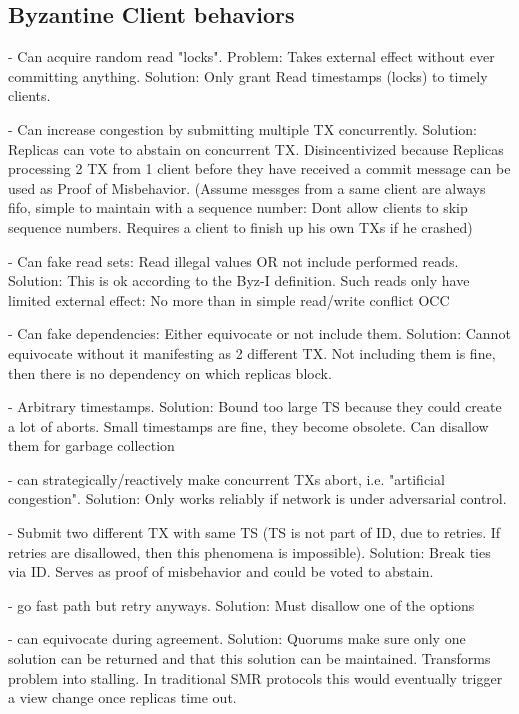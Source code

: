 \subsection{Byzantine Client behaviors}

- Can acquire random read "locks". Problem: Takes external effect without ever committing anything. Solution: Only grant Read timestamps (locks) to timely clients. 

- Can increase congestion by submitting multiple TX concurrently. Solution: Replicas can vote to abstain on concurrent TX. Disincentivized because Replicas processing 2 TX from 1 client before they have received a commit message can be used as Proof of Misbehavior. (Assume messges from a same client are always fifo, simple to maintain with a sequence number: Dont allow clients to skip sequence numbers. Requires a client to finish up his own TXs if he crashed)

- Can fake read sets: Read illegal values OR not include performed reads. Solution: This is ok according to the Byz-I definition. Such reads only have limited external effect: No more than in simple read/write conflict OCC

- Can fake dependencies: Either equivocate or not include them. Solution: Cannot equivocate without it manifesting as 2 different TX. Not including them is fine, then there is no dependency on which replicas block.

- Arbitrary timestamps. Solution: Bound too large TS because they could create a lot of aborts. Small timestamps are fine, they become obsolete. Can disallow them for garbage collection

- can strategically/reactively make concurrent TXs abort, i.e. "artificial congestion". Solution: Only works reliably if network is under adversarial control.

- Submit two different TX with same TS (TS is not part of ID, due to retries. If retries are disallowed, then this phenomena is impossible). Solution: Break ties via ID. Serves as proof of misbehavior and could be voted to abstain.

- go fast path but retry anyways. Solution: Must disallow one of the options

- can equivocate during agreement. Solution: Quorums make sure only one solution can be returned and that this solution can be maintained. Transforms problem into stalling. In traditional SMR protocols this would eventually trigger a view change once replicas time out.

